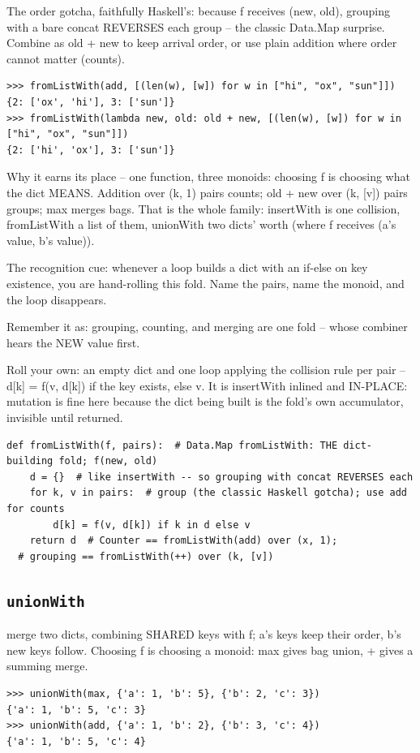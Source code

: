 \documentclass[10pt,letterpaper]{book}
\begin{document}
The order gotcha, faithfully Haskell's: because f receives (new, old), grouping with a bare concat REVERSES each group -- the classic Data.Map surprise. Combine as old + new to keep arrival order, or use plain addition where order cannot matter (counts).

\begin{lstlisting}[style=ex]
>>> fromListWith(add, [(len(w), [w]) for w in ["hi", "ox", "sun"]])
{2: ['ox', 'hi'], 3: ['sun']}
>>> fromListWith(lambda new, old: old + new, [(len(w), [w]) for w in ["hi", "ox", "sun"]])
{2: ['hi', 'ox'], 3: ['sun']}
\end{lstlisting}

Why it earns its place -- one function, three monoids: choosing f is choosing what the dict MEANS. Addition over (k, 1) pairs counts; old + new over (k, [v]) pairs groups; max merges bags. That is the whole family: insertWith is one collision, fromListWith a list of them, unionWith two dicts' worth (where f receives (a's value, b's value)).


The recognition cue: whenever a loop builds a dict with an if-else on key existence, you are hand-rolling this fold. Name the pairs, name the monoid, and the loop disappears.


Remember it as: grouping, counting, and merging are one fold -- whose combiner hears the NEW value first.


Roll your own: an empty dict and one loop applying the collision rule per pair -- d[k] = f(v, d[k]) if the key exists, else v. It is insertWith inlined and IN-PLACE: mutation is fine here because the dict being built is the fold's own accumulator, invisible until returned.

\begin{lstlisting}[style=ex]
def fromListWith(f, pairs):  # Data.Map fromListWith: THE dict-building fold; f(new, old)
    d = {}  # like insertWith -- so grouping with concat REVERSES each
    for k, v in pairs:  # group (the classic Haskell gotcha); use add for counts
        d[k] = f(v, d[k]) if k in d else v
    return d  # Counter == fromListWith(add) over (x, 1);
  # grouping == fromListWith(++) over (k, [v])
\end{lstlisting}

\subsection{\texttt{unionWith}}\label{def:unionWith}
merge two dicts, combining SHARED keys with f; a's keys keep their order, b's new keys follow. Choosing f is choosing a monoid: max gives bag union, + gives a summing merge.
\begin{lstlisting}[style=ex]
>>> unionWith(max, {'a': 1, 'b': 5}, {'b': 2, 'c': 3})
{'a': 1, 'b': 5, 'c': 3}
>>> unionWith(add, {'a': 1, 'b': 2}, {'b': 3, 'c': 4})
{'a': 1, 'b': 5, 'c': 4}
\end{lstlisting}
\end{document}

